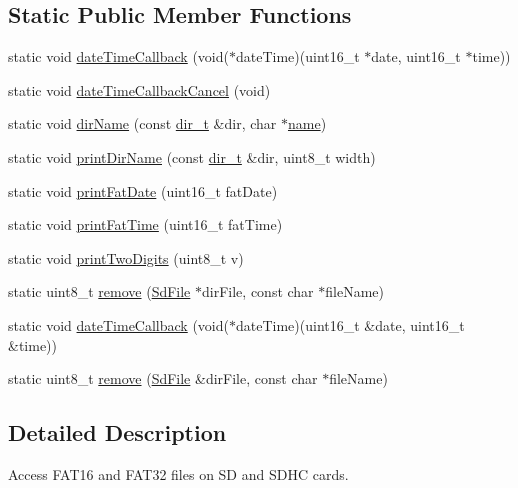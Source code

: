 \subsection*{Static Public Member Functions}
\begin{DoxyCompactItemize}
\item 
static void \hyperlink{class_sd_file_a2d78e6a8cedbf8ce545af68457b43bf1}{date\+Time\+Callback} (void($\ast$date\+Time)(uint16\+\_\+t $\ast$date, uint16\+\_\+t $\ast$time))
\item 
static void \hyperlink{class_sd_file_adaec83fdbd8473a8e336e27b8622f673}{date\+Time\+Callback\+Cancel} (void)
\item 
static void \hyperlink{class_sd_file_ad7bbb106aa4c96c795c88b33def677bc}{dir\+Name} (const \hyperlink{_fat_structs_8h_a803db59d4e16a0c54a647afc6a7954e3}{dir\+\_\+t} \&dir, char $\ast$\hyperlink{_fat_structs_8h_a30308c9b983377042fd2cc8900454fb1}{name})
\item 
static void \hyperlink{class_sd_file_a7267e3def5cba51149ff98baf5d3f2c8}{print\+Dir\+Name} (const \hyperlink{_fat_structs_8h_a803db59d4e16a0c54a647afc6a7954e3}{dir\+\_\+t} \&dir, uint8\+\_\+t width)
\item 
static void \hyperlink{class_sd_file_a77022a204f3e5148e78e1b7ae7b6865a}{print\+Fat\+Date} (uint16\+\_\+t fat\+Date)
\item 
static void \hyperlink{class_sd_file_ab981ea789ec76d1a44e4b3c8a84ccd35}{print\+Fat\+Time} (uint16\+\_\+t fat\+Time)
\item 
static void \hyperlink{class_sd_file_a0af47048953a2d1526db9336c39a8919}{print\+Two\+Digits} (uint8\+\_\+t v)
\item 
static uint8\+\_\+t \hyperlink{class_sd_file_ab932b7896dce90a29031f3a9039807a2}{remove} (\hyperlink{class_sd_file}{Sd\+File} $\ast$dir\+File, const char $\ast$file\+Name)
\item 
static void \hyperlink{class_sd_file_a88a9b32bfec07c8c5cfdf8a36b7faf26}{date\+Time\+Callback} (void($\ast$date\+Time)(uint16\+\_\+t \&date, uint16\+\_\+t \&time))
\item 
static uint8\+\_\+t \hyperlink{class_sd_file_aaea53aa58f7577dfafd0da3cb084f6d1}{remove} (\hyperlink{class_sd_file}{Sd\+File} \&dir\+File, const char $\ast$file\+Name)
\end{DoxyCompactItemize}


\subsection{Detailed Description}
Access F\+A\+T16 and F\+A\+T32 files on SD and S\+D\+HC cards. 

